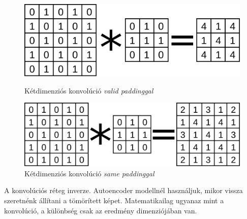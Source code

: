 \begin{figure}[h!]
	\centering

	\begin{minipage}[c]{0.45\linewidth}
		\centering
		\includegraphics[scale=0.2]{img/konv-pelda.pdf}
		\captionsetup{justification=centering}
		\caption{Kétdimenziós konvolúció \textit{valid paddinggal}}
		\label{fig:conv-pelda-valid}
		
	\end{minipage}\hfill
	\begin{minipage}[c]{0.45\linewidth}
		\centering
		\includegraphics[scale=0.2]{img/konv-pelda-same-padding.pdf}
		\captionsetup{justification=centering}
		\caption{Kétdimenziós konvolúció \textit{same paddinggal}}
		\label{fig:conv-pelda-same}
		
	\end{minipage}
	
\end{figure}





A konvolúciós réteg inverze.
Autoencoder modellnél használjuk, mikor vissza szeretnénk állítani
a tömörített képet. Matematikailag ugyanaz mint a konvolúció,
a különbség csak az eredmény dimenziójában van.


